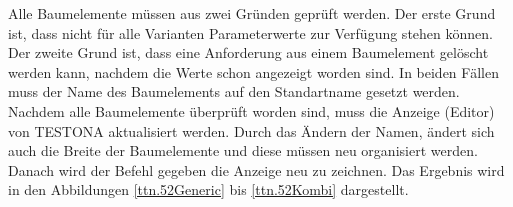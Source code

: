 Alle Baumelemente müssen aus zwei Gründen geprüft werden. Der erste Grund ist, dass nicht für alle Varianten Parameterwerte zur Verfügung stehen können. Der zweite Grund ist, dass eine Anforderung aus einem Baumelement gelöscht werden kann, nachdem die Werte schon angezeigt worden sind. In beiden Fällen muss der Name des Baumelements auf den Standartname gesetzt werden.\\


Nachdem alle Baumelemente überprüft worden sind, muss die Anzeige (Editor) von TESTONA aktualisiert werden. Durch das Ändern der Namen, ändert sich auch die Breite der Baumelemente und diese müssen neu organisiert werden. Danach wird der Befehl gegeben die Anzeige neu zu zeichnen. Das Ergebnis wird in den Abbildungen \ref{ttn.52Generic} bis \ref{ttn.52Kombi} dargestellt.



